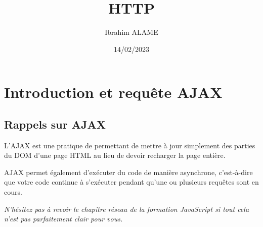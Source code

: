 \documentclass{article}
\title{HTTP}
\author{Ibrahim ALAME}
\date{14/02/2023}
\begin{document}
\maketitle

\section{Introduction et requête AJAX}
\subsection{Rappels sur {\color{monOrange}AJAX}}



L'{\color{monOrange}AJAX} est une pratique de permettant de mettre à jour simplement des parties du DOM d'une page HTML au lieu de devoir recharger la page entière.

AJAX permet également d'exécuter du code de manière asynchrone, c'est-à-dire que votre code continue à s'exécuter pendant qu'une ou plusieurs requêtes sont en cours.

{\em N'hésitez pas à revoir le chapitre réseau de la formation JavaScript si tout cela n'est pas parfaitement clair pour vous.}
\end{document}
